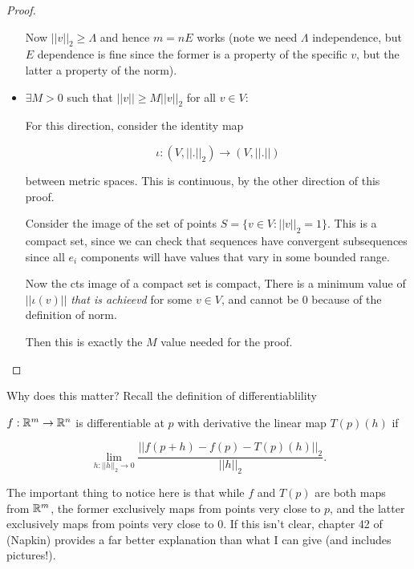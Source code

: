 \documentclass[11pt]{scrartcl}
\begin{document}
\begin{theorem}
\begin{proof}
\begin{itemize}
    Now $||v||_2 \ge \Lambda$ and hence $m = nE$ works (note we need $\Lambda$ independence, but $E$ dependence is fine since the former is a property of the specific $v$, but the latter a property of the norm).

    \item $\exists M > 0$ such that $||v|| \ge M ||v||_2$ for all $v \in V$:
    
    For this direction, consider the identity map 

    \begin{equation}
        \iota : (V, ||.||_2) \rightarrow (V, ||.||)
    \end{equation}

    between metric spaces. This is continuous, by the other direction of this proof. 
    
    Consider the image of the set of points $S = \{  v \in V : ||v||_2 = 1 \}$. This is a compact set, since we can check that sequences have convergent subsequences since all $e_i$ components will have values that vary in some bounded range.

    Now the cts image of a compact set is compact, There is a minimum value of $||\iota(v)||$ \textit{that is achieevd} for some $v \in V$, and cannot be 0 because of the definition of norm.

    Then this is exactly the $M$ value needed for the proof.
\end{itemize}
\end{proof}
\end{theorem}

Why does this matter? Recall the definition of differentiablility

\begin{definition}

$f: \mathbb R^m \to \mathbb R^n$ is differentiable at $p$ with derivative the linear map $T(p)(h)$ if 

\begin{equation}
    \lim_{h : ||h||_2 \rightarrow 0} \frac{ || f(p + h) - f(p) - T(p)(h) ||_2 }{||h||_2}.
\end{equation}

\label{derivvers}
\end{definition}

The important thing to notice here is that while $f$ and $T(p)$ are both maps from $\mathbb R^m$, the former exclusively maps from points very close to $p$, and the latter exclusively maps from points very close to 0. If this isn't clear, chapter 42 of \cite{Napkin} (Napkin) provides a far better explanation than what I can give (and includes pictures!).
\end{document}
